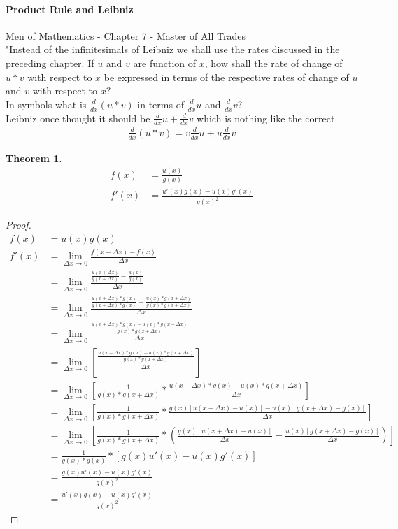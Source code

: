 \documentclass{article}
\newtheorem{theorem}{Theorem}[section]
\theoremstyle{definition}
\begin{document}
\paragraph{Product Rule and Leibniz}
Men of Mathematics - Chapter 7 - Master of All Trades\\
"Instead of the infinitesimals of Leibniz we shall use the rates discussed in the preceding chapter. If $u$ and $v$ are function of $x$, how shall the rate of change of $u*v$ with respect to $x$ be expressed in terms of the respective rates of change of $u$ and $v$ with respect to $x$?\\
In symbols what is $\frac{d}{dx}(u*v)$ in terms of $\frac{d}{dx}u$ and $\frac{d}{dx}v$?\\
Leibniz once thought it should be $\frac{d}{dx}u+\frac{d}{dx}v$ which is nothing like the correct\\
\begin{align}
	\frac{d}{dx}(u*v) = v\frac{d}{dx}u + u\frac{d}{dx}v
\end{align}

\clearpage
\begin{theorem}
	\begin{align*}
	f(x)&=\frac {u(x)} {g(x)} \\
	f'(x)&=\frac{u'(x)g(x)-u(x)g'(x)}{g(x)^2}
	\end{align*}
\end{theorem}
\begin{proof}
	\begin{align*}
	f(x) &= u(x)g(x) \\
	f'(x) &= \lim_{\Delta x \to 0} {\frac {f(x+\Delta x) - f(x)} {\Delta x}} \\
	&= \lim_{\Delta x \to 0} {\frac {\frac {u(x+\Delta x)} {g(x+\Delta x)} - \frac {u(x)}{g(x)}} {\Delta x}} \\
	&= \lim_{\Delta x \to 0} {\frac {\frac {u(x+\Delta x)*g(x)} {g(x+\Delta x)*g(x)} - \frac {u(x)*g(x+\Delta x)}{g(x)*g(x+\Delta x)}} {\Delta x}} \\	
	&= \lim_{\Delta x \to 0} {\frac {\frac {u(x+\Delta x)*g(x) - u(x)*g(x+\Delta x)} {g(x)*g(x+\Delta x)}} {\Delta x}} \\
	&= \lim_{\Delta x \to 0} \left[ {\frac {\frac {u(x+\Delta x)*g(x) - u(x)*g(x+\Delta x)} {g(x)*g(x+\Delta x)}} {\Delta x}} \right] \\
	&= \lim_{\Delta x \to 0} \left[ {\frac {1} {g(x)*g(x+\Delta x)} * \frac {u(x+\Delta x)*g(x) - u(x)*g(x+\Delta x)} {\Delta x}} \right] \\
	&= \lim_{\Delta x \to 0} \left[ {\frac {1} {g(x)*g(x+\Delta x)} * \frac {g(x)[u(x+\Delta x)-u(x)] - u(x)[g(x+\Delta x) - g(x)]} {\Delta x}} \right] \\
	&= \lim_{\Delta x \to 0} \left[ {\frac {1} {g(x)*g(x+\Delta x)} * \left( \frac {g(x)[u(x+\Delta x)-u(x)]} {\Delta x} - \frac {u(x)[g(x+\Delta x) - g(x)]} {\Delta x} \right)} \right]\\
	&= \frac {1} {g(x)*g(x)} * \left[ g(x)u'(x) - u(x)g'(x) \right]\\
	&= \frac {g(x)u'(x) - u(x)g'(x)} {g(x)^2}\\
	&= \frac {u'(x)g(x) - u(x)g'(x)} {g(x)^2}
	\end{align*}
\end{proof}
\end{document}
